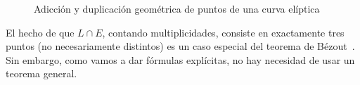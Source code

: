 \begin{figure}[h]
  \myfloatalign
  \quad
  \caption{Adicción y duplicación geométrica de puntos de una curva elíptica}\label{fig:Adicción y duplicación geométrica de puntos de una curva elíptica}
\end{figure}

El hecho de que $L \cap E$, contando multiplicidades, consiste en exactamente tres puntos (no necesariamente distintos) es un caso especial del teorema de Bézout~\cite[sec. I.7.8]{Hartshorne:1977}. Sin embargo, como vamos a dar fórmulas explícitas, no hay necesidad de usar un teorema general.

